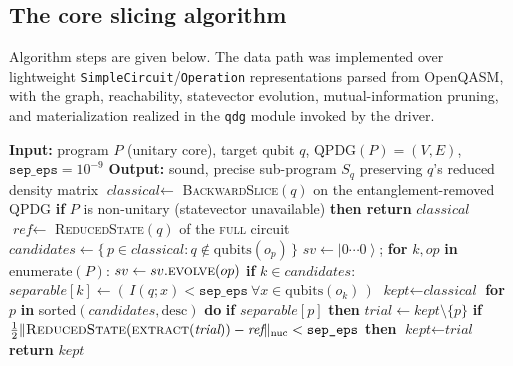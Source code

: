 \documentclass[10pt,conference]{IEEEtran}
\providecommand{\ket}[1]{\ensuremath{\left|#1\right\rangle}}
\theoremstyle{definition}
\begin{document}
\subsection{The core slicing algorithm}
Algorithm steps are given below. The data path was implemented over lightweight \texttt{SimpleCircuit}/\texttt{Operation} representations parsed from OpenQASM, with the graph, reachability, statevector evolution, mutual-information pruning, and materialization realized in the \texttt{qdg} module invoked by the driver.

\begin{algorithmic}[1]
  \STATE \textbf{Input:} program $P$ (unitary core), target qubit $q$, $\mathrm{QPDG}(P)=(V,E)$, $\texttt{sep\_eps}=10^{-9}$
  \STATE \textbf{Output:} sound, precise sub-program $S_q$ preserving $q$'s reduced density matrix
  \STATE $\textit{classical} \gets$ \textsc{BackwardSlice}$(q)$ on the entanglement-removed QPDG 
  \STATE \textbf{if} $P$ is non-unitary (statevector unavailable) \textbf{then return} $\textit{classical}$ 
  \STATE $\textit{ref} \gets$ \textsc{ReducedState}$(q)$ of the \textsc{full} circuit 
  \STATE $\textit{candidates} \gets \{\,p\in\textit{classical}: q\notin\mathrm{qubits}(o_p)\,\}$ 
  \STATE $sv \gets \ket{0\cdots0}$; \textbf{for} $k,op$ \textbf{in} enumerate$(P)$: $sv \gets sv.\textsc{evolve}(op)$ 
  \STATE \quad \textbf{if} $k\in\textit{candidates}$: $\textit{separable}[k]\gets(\,I(q;x)<\texttt{sep\_eps}\ \forall x\in\mathrm{qubits}(o_k)\,)$
  \STATE $\textit{kept}\gets\textit{classical}$
  \STATE \textbf{for} $p$ \textbf{in} sorted$(\textit{candidates},\text{desc})$ \textbf{do}
  \STATE \quad \textbf{if} $\textit{separable}[p]$ \textbf{then}
  \STATE \quad\quad $\textit{trial}\gets\textit{kept}\setminus\{p\}$
  \STATE \quad\quad \textbf{if} $\tfrac{1}{2}\lVert\textsc{ReducedState}(\textsc{extract}(\textit{trial}))-\textit{ref}\rVert_{\mathrm{nuc}}<\texttt{sep\_eps}$ \textbf{then} $\textit{kept}\gets\textit{trial}$
  \STATE \textbf{return} $\textit{kept}$
\end{algorithmic}
\end{document}
